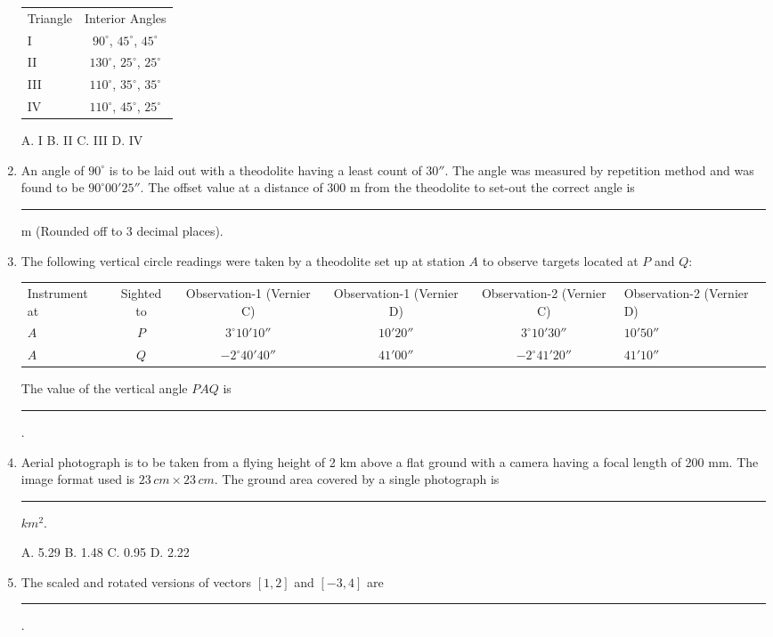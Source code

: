 \documentclass[journal,12pt,onecolumn]{IEEEtran}
\begin{document}
\begin{enumerate}
\begin{tabular}{lc}
Triangle & Interior Angles \\
I & $90^\circ$, $45^\circ$, $45^\circ$ \\
II & $130^\circ$, $25^\circ$, $25^\circ$ \\
III & $110^\circ$, $35^\circ$, $35^\circ$ \\
IV & $110^\circ$, $45^\circ$, $25^\circ$ \\
\end{tabular}

    A. I \quad
    B. II \quad
    C. III \quad
    D. IV

    \item An angle of $90^\circ$ is to be laid out with a theodolite having a least count of $30''$. The angle was measured by repetition method and was found to be $90^\circ 00' 25''$. The offset value at a distance of 300 m from the theodolite to set-out the correct angle is \rule{3cm}{0.15mm} m (Rounded off to 3 decimal places).

    \item The following vertical circle readings were taken by a theodolite set up at station $A$ to observe targets located at $P$ and $Q$:

\begin{tabular}{lcccc}
Instrument at & Sighted to & Observation-1 (Vernier C) & Observation-1 (Vernier D) & Observation-2 (Vernier C) & Observation-2 (Vernier D) \\
$A$ & $P$ & $3^\circ 10' 10''$ & $10' 20''$ & $3^\circ 10' 30''$ & $10' 50''$ \\
$A$ & $Q$ & $-2^\circ 40' 40''$ & $41' 00''$ & $-2^\circ 41' 20''$ & $41' 10''$ \\
\end{tabular}

The value of the vertical angle $PAQ$ is \rule{3cm}{0.15mm}.

    \item Aerial photograph is to be taken from a flying height of 2 km above a flat ground with a camera having a focal length of 200 mm. The image format used is $23\,cm \times 23\,cm$. The ground area covered by a single photograph is \rule{3cm}{0.15mm} $km^2$.

    A. 5.29 \quad
    B. 1.48 \quad
    C. 0.95 \quad
    D. 2.22

    \item The scaled and rotated versions of vectors $[1, 2]$ and $[-3, 4]$ are \rule{3cm}{0.15mm}.


\end{enumerate}
\end{document}
